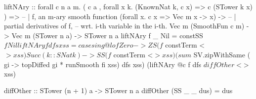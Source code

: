 \documentclass[runningheads]{llncs}
\begin{document}
\begin{code}
  liftNAry :: forall c n a m.
  ( c a
  , forall x k. (KnownNat k, c x)
        => c (STower k x)
  ) =>
  -- | f, an m-ary smooth function
  (forall x. c x => Vec m x -> x) ->
  -- | partial derivatives of f,
  -- wrt. i-th variable in the i-th.
  Vec m (SmoothFun c m) ->
  Vec m (STower n a) ->
  STower n a
liftNAry f _ Nil = constSS $ f Nil
liftNAry f dfs xss =
  case sing @l of
    Zero ->
      ZS (f $ constTerm <$> xss)
    Succ (k :: SNat k) ->
      SS (f $ constTerm <$> xss)
         ( sum
         $ SV.zipWithSame
           ( \fi gi ->
               topDiffed gi
             * runSmooth fi xss)
           dfs xss)
         (liftNAry @c f dfs
         $ diffOther <$> xss)

diffOther :: STower (n + 1) a
          -> STower n a
diffOther (SS _ _ dus) = dus
\end{code}

\printbibliography
\end{document}
